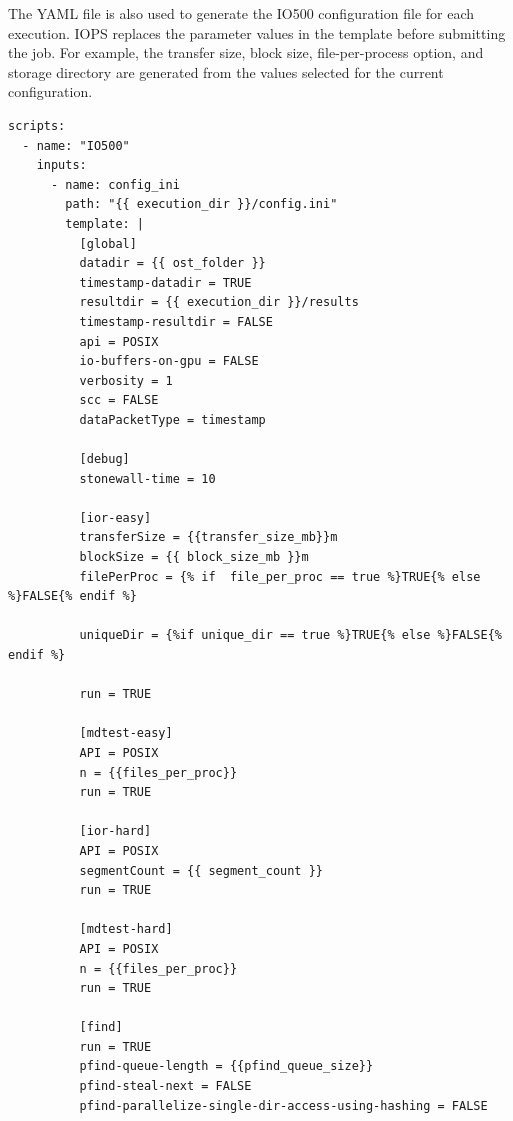 The YAML file is also used to generate the IO500 configuration file for
each execution. IOPS replaces the parameter values in the template before
submitting the job. For example, the transfer size, block size,
file-per-process option, and storage directory are generated from the
values selected for the current configuration. 

\begin{verbatim}
scripts:
  - name: "IO500"
    inputs:
      - name: config_ini
        path: "{{ execution_dir }}/config.ini"
        template: |
          [global]
          datadir = {{ ost_folder }}
          timestamp-datadir = TRUE
          resultdir = {{ execution_dir }}/results
          timestamp-resultdir = FALSE
          api = POSIX
          io-buffers-on-gpu = FALSE
          verbosity = 1
          scc = FALSE
          dataPacketType = timestamp

          [debug]
          stonewall-time = 10

          [ior-easy]
          transferSize = {{transfer_size_mb}}m
          blockSize = {{ block_size_mb }}m
          filePerProc = {% if  file_per_proc == true %}TRUE{% else %}FALSE{% endif %}

          uniqueDir = {%if unique_dir == true %}TRUE{% else %}FALSE{% endif %}

          run = TRUE

          [mdtest-easy]
          API = POSIX
          n = {{files_per_proc}}
          run = TRUE

          [ior-hard]
          API = POSIX
          segmentCount = {{ segment_count }}
          run = TRUE

          [mdtest-hard]
          API = POSIX
          n = {{files_per_proc}}
          run = TRUE

          [find]
          run = TRUE
          pfind-queue-length = {{pfind_queue_size}}
          pfind-steal-next = FALSE
          pfind-parallelize-single-dir-access-using-hashing = FALSE
\end{verbatim}


